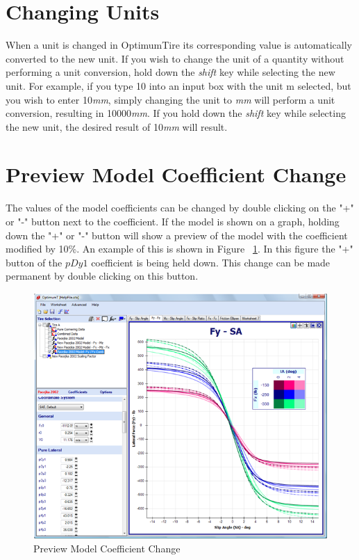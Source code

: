 \section{Changing Units}
\label{sec:ChangingUnits}	
When a unit is changed in OptimumTire its corresponding value is automatically converted to the new unit. If you wish to change the unit of a quantity without performing a unit conversion, hold down the \textsl{shift} key while selecting the new unit. For example, if you type 10 into an input box with the unit m selected, but you wish to enter 10\textsl{mm}, simply changing the unit to \textsl{mm} will perform a unit conversion, resulting in 10000\textsl{mm}. If you hold down the \textsl{shift} key while selecting the new unit, the desired result of 10\textsl{mm} will result.

\section{Preview Model Coefficient Change}
\label{sec:PreviewModelCoefficientChange}
The values of the model coefficients can be changed by double clicking on the "+" or "-" button next to the coefficient. If the model is shown on a graph, holding down the "+" or "-" button will show a preview of the model with the coefficient modified by 10\%. An example of this is shown in Figure ~\ref{fig:PreviewCoefChange}. In this figure the "+" button of the $pDy1$ coefficient is being held down. This change can be made permanent by double clicking on this button. 

\begin{figure}[H]
	\centering
		\includegraphics[width=1.0\textwidth]{PreviewCoefChange.png}
	\caption{Preview Model Coefficient Change}
	\label{fig:PreviewCoefChange}
\end{figure}

